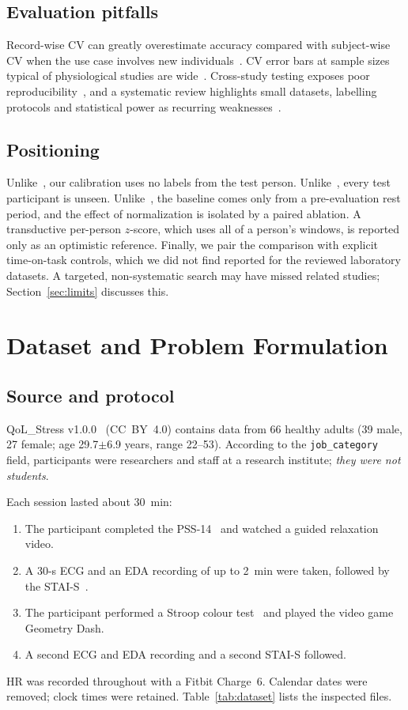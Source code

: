 \documentclass[conference]{IEEEtran}
\begin{document}
\subsection{Evaluation pitfalls}
Record-wise CV can greatly overestimate accuracy compared with subject-wise CV when the use case involves new individuals~\cite{saeb2017usecase}. CV error bars at sample sizes typical of physiological studies are wide~\cite{varoquaux2018cv}. Cross-study testing exposes poor reproducibility~\cite{mishra2020reproducibility}, and a systematic review highlights small datasets, labelling protocols and statistical power as recurring weaknesses~\cite{vos2023generalizable}.

\subsection{Positioning}
Unlike~\cite{nkurikiyeyezu2020person,sah2021personalization}, our calibration uses no labels from the test person. Unlike~\cite{tervonen2020som}, every test participant is unseen. Unlike~\cite{hovsepian2015cstress}, the baseline comes only from a pre-evaluation rest period, and the effect of normalization is isolated by a paired ablation. A transductive per-person $z$-score, which uses all of a person's windows, is reported only as an optimistic reference. Finally, we pair the comparison with explicit time-on-task controls, which we did not find reported for the reviewed laboratory datasets. A targeted, non-systematic search may have missed related studies; Section~\ref{sec:limits} discusses this.

\section{Dataset and Problem Formulation}
\subsection{Source and protocol}
QoL\_Stress v1.0.0~\cite{calvo2026qolstress} (CC~BY~4.0) contains data from 66 healthy adults (39 male, 27 female; age 29.7$\pm$6.9 years, range 22--53). According to the \texttt{job\_category} field, participants were researchers and staff at a research institute; \emph{they were not students}.

Each session lasted about 30~min:
\begin{enumerate}
\item The participant completed the PSS-14~\cite{cohen1983pss} and watched a guided relaxation video.
\item A 30-s ECG and an EDA recording of up to 2~min were taken, followed by the STAI-S~\cite{spielberger1983stai}.
\item The participant performed a Stroop colour test~\cite{stroop1935} and played the video game Geometry Dash.
\item A second ECG and EDA recording and a second STAI-S followed.
\end{enumerate}
HR was recorded throughout with a Fitbit Charge~6. Calendar dates were removed; clock times were retained. Table~\ref{tab:dataset} lists the inspected files.
\end{document}
